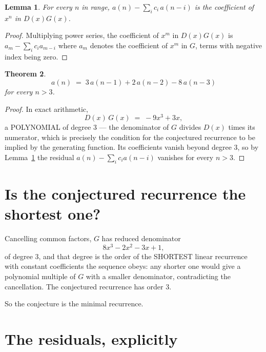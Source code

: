 \documentclass[11pt,a4paper]{article}
\theoremstyle{plain}
\newtheorem{theorem}{Theorem}
\newtheorem{lemma}[theorem]{Lemma}
\theoremstyle{definition}
\begin{document}
\begin{lemma}\label{lem:key}
For every $n$ in range, $a(n)-\sum_i c_i\,a(n-i)$ is the coefficient of $x^{n}$ in
$D(x)G(x)$.
\end{lemma}

\begin{proof}
Multiplying power series, the coefficient of $x^{m}$ in $D(x)G(x)$ is
$a_m-\sum_i c_i a_{m-i}$ where $a_m$ denotes the coefficient of $x^{m}$ in $G$, terms with
negative index being zero.
\end{proof}

\begin{theorem}
\[
a(n)\;=\;3\,a(n-1) + 2\,a(n-2) - 8\,a(n-3)
\]
for every $n>3$.
\end{theorem}

\begin{proof}
In exact arithmetic,
\[
D(x)\,G(x)\;=\;- 9 x^{3} + 3 x,
\]
a POLYNOMIAL of degree $3$ --- the denominator of $G$ divides $D(x)$ times its numerator,
which is precisely the condition for the conjectured recurrence to be implied by the
generating function. Its coefficients vanish beyond degree $3$, so by
Lemma~\ref{lem:key} the residual $a(n)-\sum_ic_ia(n-i)$ vanishes for every
$n>3$.
\end{proof}

\section{Is the conjectured recurrence the shortest one?}

Cancelling common factors, $G$ has reduced denominator
\[
8 x^{3} - 2 x^{2} - 3 x + 1,
\]
of degree $3$, and that degree is the order of the SHORTEST linear recurrence with
constant coefficients the sequence obeys: any shorter one would give a polynomial multiple of
$G$ with a smaller denominator, contradicting the cancellation. The conjectured recurrence has
order $3$.

So the conjecture is the minimal recurrence.

\section{The residuals, explicitly}
\end{document}
